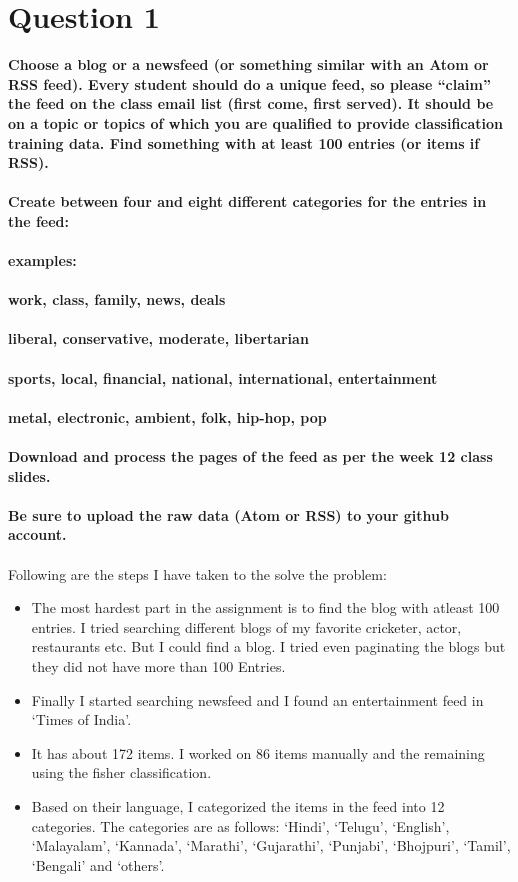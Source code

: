 \chapter{Question 1}
\label{intro}

\textbf{Choose a blog or a newsfeed (or something similar with an Atom or RSS feed).  Every student should do a unique feed, so please
``claim'' the feed on the class email list (first come, first served). It should be on a topic or topics of which you are qualified to provide classification training data.  Find something with at least 100 entries (or items if RSS).\\\\
Create between four and eight different categories for the entries in the feed:\\\\
examples: \\\\
work, class, family, news, deals\\\\
liberal, conservative, moderate, libertarian\\\\
sports, local, financial, national, international, entertainment\\\\
metal, electronic, ambient, folk, hip-hop, pop\\\\
Download and process the pages of the feed as per the week 12  class slides.\\\\
Be sure to upload the raw data (Atom or RSS) to your github account.}\\\\

\newpage
Following are the steps I have taken to the solve the problem:
\begin{itemize}
\item The most hardest part in the assignment is to find the blog with atleast 100 entries. I tried searching different blogs of my favorite cricketer, actor, restaurants etc. But I could find a blog. I tried even paginating the blogs but they did not have more than 100 Entries.
\item Finally I started searching newsfeed and I found an entertainment feed in `Times of India'.
\item It has about 172 items. I worked on 86 items manually and the remaining using the fisher classification.
\item Based on their language, I categorized the items in the feed into 12 categories. The categories are as follows: `Hindi', `Telugu', `English', `Malayalam', `Kannada', `Marathi', `Gujarathi', `Punjabi', `Bhojpuri', `Tamil', `Bengali' and `others'. 
\end{itemize}
